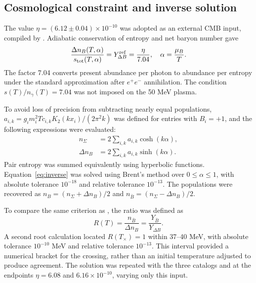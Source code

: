 \subsection{Cosmological constraint and inverse solution}
The value $\eta=(6.12\pm0.04)\times10^{-10}$ was adopted as an external CMB input, compiled by \citet{Fields2025}. Adiabatic conservation of entropy and net baryon number gave
\begin{equation}
\frac{\Delta n_B(T,\alpha)}{s_{\rm tot}(T,\alpha)}
=Y_{\Delta B}^{\rm ref}=\frac{\eta}{7.04},
\quad\alpha=\frac{\mu_B}{T}.\label{eq:inverse}
\end{equation}
The factor 7.04 converts present abundance per photon to abundance per entropy under the standard approximation after $e^+e^-$ annihilation. The condition $s(T)/n_\gamma(T)=7.04$ was not imposed on the 50 MeV plasma.

To avoid loss of precision from subtracting nearly equal populations, $a_{i,k}=g_i m_i^2T c_{i,k}K_2(kx_i)/(2\pi^2k)$ was defined for entries with $B_i=+1$, and the following expressions were evaluated:
\begin{align}
n_\Sigma&=2\sum_{i,k}a_{i,k}\cosh(k\alpha),\nonumber\\
\Delta n_B&=2\sum_{i,k}a_{i,k}\sinh(k\alpha).\label{eq:stable}
\end{align}
Pair entropy was summed equivalently using hyperbolic functions. Equation~\eqref{eq:inverse} was solved using Brent's method over $0\leq\alpha\leq1$, with absolute tolerance $10^{-18}$ and relative tolerance $10^{-13}$. The populations were recovered as $n_B=(n_\Sigma+\Delta n_B)/2$ and $n_{\bar B}=(n_\Sigma-\Delta n_B)/2$.

To compare the same criterion as \citet{Yang2022}, the ratio was defined as
\begin{equation}
R(T)=\frac{n_{\bar B}}{\Delta n_B}
=\frac{Y_{\bar B}}{Y_{\Delta B}}.\label{eq:ratio}
\end{equation}
A second root calculation located $R(T_\times)=1$ within 37--40 MeV, with absolute tolerance $10^{-10}$ MeV and relative tolerance $10^{-13}$. This interval provided a numerical bracket for the crossing, rather than an initial temperature adjusted to produce agreement. The solution was repeated with the three catalogs and at the endpoints $\eta=6.08$ and $6.16\times10^{-10}$, varying only this input.

